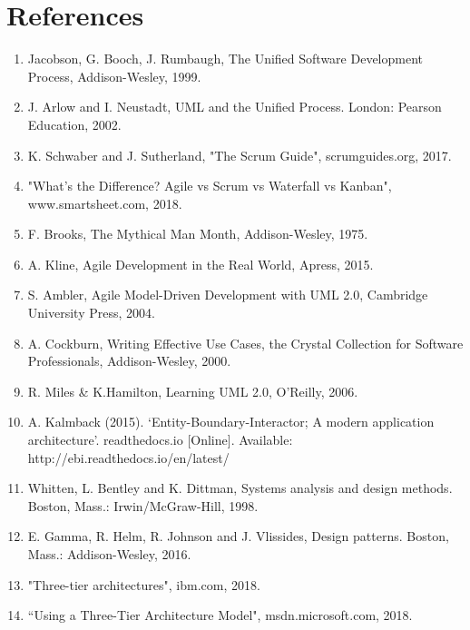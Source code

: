 \newpage

\hypertarget{references}{%
\section{References}\label{references}}

\begin{enumerate}
  \item Jacobson, G. Booch, J. Rumbaugh, The Unified Software Development Process, Addison-Wesley, 1999.
  \item J. Arlow and I. Neustadt, UML and the Unified Process. London: Pearson Education, 2002.
  \item K. Schwaber and J. Sutherland, "The Scrum Guide", scrumguides.org, 2017. 
  \item "What's the Difference? Agile vs Scrum vs Waterfall vs Kanban", www.smartsheet.com, 2018. 
  \item F. Brooks, The Mythical Man Month, Addison-Wesley, 1975.
  \item A. Kline, Agile Development in the Real World, Apress, 2015.  
  \item S. Ambler, Agile Model-Driven Development with UML 2.0, Cambridge University Press, 2004.
  \item A. Cockburn, Writing Effective Use Cases, the Crystal Collection for Software Professionals, Addison-Wesley, 2000.
  \item R. Miles & K.Hamilton, Learning UML 2.0, O’Reilly, 2006.
  \item A. Kalmback (2015). ‘Entity-Boundary-Interactor; A modern application architecture’. readthedocs.io [Online]. Available: http://ebi.readthedocs.io/en/latest/
  \item Whitten, L. Bentley and K. Dittman, Systems analysis and design methods. Boston, Mass.: Irwin/McGraw-Hill, 1998.
  \item E. Gamma, R. Helm, R. Johnson and J. Vlissides, Design patterns. Boston, Mass.: Addison-Wesley, 2016.
  \item "Three-tier architectures", ibm.com, 2018.
  \item “Using a Three-Tier Architecture Model", msdn.microsoft.com, 2018. 
\end{enumerate}
